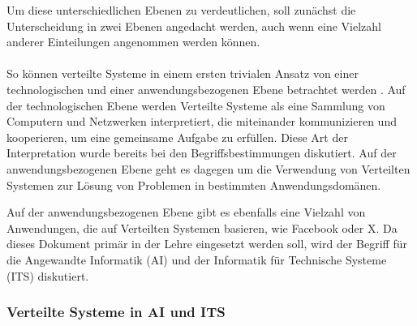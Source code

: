 \documentclass[../vs-script-first-v01.tex]{subfiles}
\begin{document}
Um diese unterschiedlichen Ebenen zu verdeutlichen, soll zunächst die Unterscheidung in zwei Ebenen angedacht werden, auch wenn eine Vielzahl anderer Einteilungen angenommen werden können.
\\\\
So können verteilte Systeme in einem ersten trivialen Ansatz von einer technologischen und einer anwendungsbezogenen Ebene betrachtet werden \cite{coulouris2012distributed}. Auf der technologischen Ebene werden Verteilte Systeme als eine Sammlung von Computern und Netzwerken interpretiert, die miteinander kommunizieren und kooperieren, um eine gemeinsame Aufgabe zu erfüllen. Diese Art der Interpretation wurde bereits bei den Begriffsbestimmungen diskutiert. Auf der anwendungsbezogenen Ebene geht es dagegen um die Verwendung von Verteilten Systemen zur Lösung von Problemen in bestimmten Anwendungsdomänen.

Auf der anwendungsbezogenen Ebene gibt es ebenfalls eine Vielzahl von Anwendungen, die auf Verteilten Systemen basieren, wie Facebook oder X. 
Da dieses Dokument primär in der Lehre eingesetzt werden soll, wird der Begriff für die Angewandte Informatik (AI) und der Informatik für Technische Systeme (ITS) diskutiert.

\subsubsection{Verteilte Systeme in AI und ITS}
\end{document}
